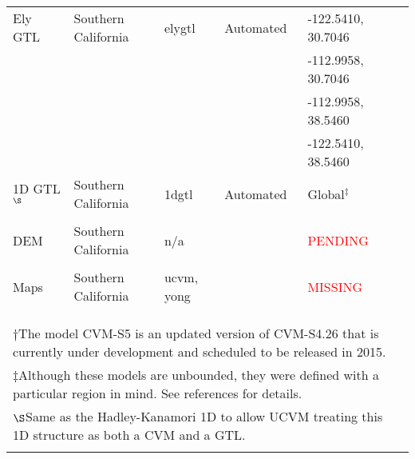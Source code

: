 \begin{table*}
\begin{tabular}[]{llllll}
\hline
Ely GTL            & Southern California   & elygtl        &  Automated   & -122.5410, 30.7046 & \citet{Ely_2010_AGU}         \\
                   &                       &               &              & -112.9958, 30.7046 &                              \\
                   &                       &               &              & -112.9958, 38.5460 &                              \\
                   &                       &               &              & -122.5410, 38.5460 &                              \\
1D GTL$^\S$        & Southern California   & 1dgtl         &  Automated   & Global$^\ddagger$  & \citet{Kanamori_1975_Chap}   \\
                   &                       &               &              &                    & \citet{Hadley_1977_GSAB}     \\
DEM                & Southern California   & n/a           &              & \textcolor{red}{PENDING} & \citet{Gesch_2002_PERS}      \\
                   &                       &               &              &                    & \citet{Gesch_2007_Chap}      \\
\vsthirty{} Maps   & Southern California   & ucvm, yong    &              & \textcolor{red}{MISSING} & \citet{Wills_2006_BSSA}      \\
                   &                       &               &              &                    & \citet{Wald_2007_BSSA}       \\
                   &                       &               &              &                    & \citet{Yong_2012_BSSA}       \\
                   &                       &               &              &                    &                              \\
\hline
\multicolumn{6}{l}{$\dagger$\quad\footnotesize The model CVM-S5 is an updated version of CVM-S4.26 that is currently under development and scheduled to be released in 2015.}\\
\multicolumn{6}{l}{$\ddagger$\quad\footnotesize Although these models are unbounded, they were defined with a particular region in mind. See references for details.}\\
\multicolumn{6}{l}{$\S$\quad\footnotesize Same as the Hadley-Kanamori 1D to allow UCVM treating this 1D structure as both a CVM and a GTL.}\\
\\
\end{tabular}
\label{tab:cvms}
\end{table*}


